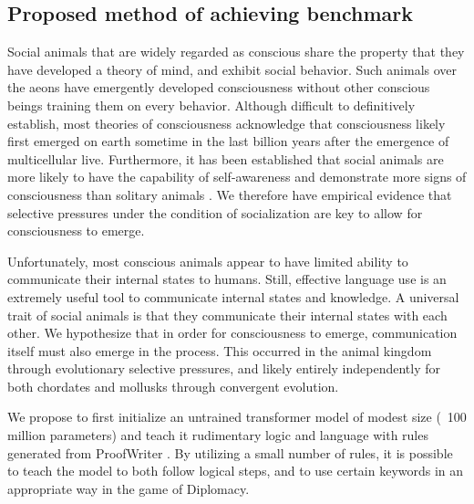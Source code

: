\documentclass{article}
\begin{document}
\subsection{Proposed method of achieving benchmark}

Social animals that are widely regarded as conscious share the property that they have developed a theory of mind, and exhibit social behavior. Such animals over the aeons have emergently developed consciousness without other conscious beings training them on every behavior. Although difficult to definitively establish, most theories of consciousness acknowledge that consciousness likely first emerged on earth sometime in the last billion years after the emergence of multicellular live. Furthermore, it has been established that social animals are more likely to have the capability of self-awareness and demonstrate more signs of consciousness than solitary animals \citep{lei2023sociality}.  We therefore have empirical evidence that selective pressures under the condition of socialization are key to allow for consciousness to emerge.

Unfortunately, most conscious animals appear to have limited ability to communicate their internal states to humans. Still, effective language use is an extremely useful tool to communicate internal states and knowledge. A universal trait of social animals is that they communicate their internal states with each other. We hypothesize that in order for consciousness to emerge, communication itself must also emerge in the process. This occurred in the animal kingdom through evolutionary selective pressures, and likely entirely independently for both chordates and mollusks through convergent evolution.

We propose to first initialize an untrained transformer model of modest size (~100 million parameters) and teach it rudimentary logic and language with rules generated from ProofWriter \citep{tafjord2021proofwritergeneratingimplicationsproofs}. By utilizing a small number of rules, it is possible to teach the model to both follow logical steps, and to use certain keywords in an appropriate way in the game of Diplomacy.
\end{document}
